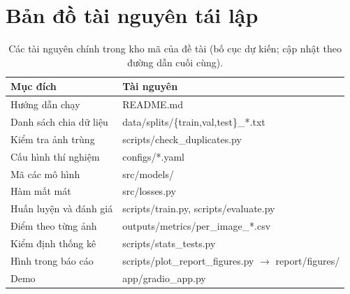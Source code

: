 \documentclass[10pt,twoside]{article}
\begin{document}
\section{Bản đồ tài nguyên tái lập}\label{app:artifacts}
\begin{table}[h]
\centering
\caption{Các tài nguyên chính trong kho mã của đề tài (bố cục dự kiến; cập nhật theo
đường dẫn cuối cùng).}\label{tab:artifacts}
\begin{tabular}{@{}ll@{}}
\toprule
Mục đích & Tài nguyên \\
\midrule
Hướng dẫn chạy           & README.md \\
Danh sách chia dữ liệu   & data/splits/\{train,val,test\}\_*.txt \\
Kiểm tra ảnh trùng       & scripts/check\_duplicates.py \\
Cấu hình thí nghiệm      & configs/*.yaml \\
Mã các mô hình           & src/models/ \\
Hàm mất mát              & src/losses.py \\
Huấn luyện và đánh giá   & scripts/train.py, scripts/evaluate.py \\
Điểm theo từng ảnh       & outputs/metrics/per\_image\_*.csv \\
Kiểm định thống kê       & scripts/stats\_tests.py \\
Hình trong báo cáo       & \makecell[l]{scripts/plot\_report\_figures.py\\ $\rightarrow$ report/figures/} \\
Demo                     & app/gradio\_app.py \\
\bottomrule
\end{tabular}
\end{table}

\printreferences
\end{document}

